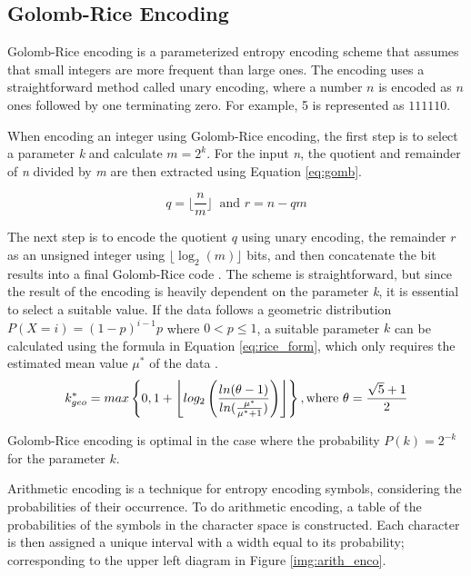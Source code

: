 \subsection{Golomb-Rice Encoding}
Golomb-Rice encoding is a parameterized entropy encoding scheme that assumes that small integers are more frequent than large ones. The encoding uses a straightforward method called unary encoding, where a number \(n\) is encoded as $n$ ones followed by one terminating zero. For example, 5 is represented as \(111110\).

When encoding an integer using Golomb-Rice encoding, the first step is to select a parameter \textit{k} and calculate \(m = 2^k\). For the input \textit{n}, the quotient and remainder of \textit{n} divided by \textit{m} are then extracted using Equation \ref{eq:gomb}.

\begin{equation}
q =\lfloor\frac{n}{m}\rfloor\
   \text{ and }
r = n - qm
\label{eq:gomb}
\end{equation}

The next step is to encode the quotient $q$ using unary encoding, the remainder $r$ as an unsigned integer using $\lfloor \log_2(m) \rfloor$ bits, and then concatenate the bit results into a final Golomb-Rice code \cite{rice2}. The scheme is straightforward, but since the result of the encoding is heavily dependent on the parameter \textit{k}, it is essential to select a suitable value. If the data follows a geometric distribution \(P(X = i) = (1 - p)^{i - 1}p\) where \(0 < p \leq 1\), a suitable parameter $k$  can be calculated using the formula in Equation \ref{eq:rice_form}, which only requires the estimated mean value $\mu^*$ of the data \cite{rice}. 
\begin{equation}\label{eq:rice_form}
k^{*}_{geo} = max \left \{ 0, 1 + \left \lfloor log_2\left ( \frac{ln (\theta  - 1)}{ln(\frac{\mu^* }{\mu^* + 1})} \right ) \right \rfloor \right \},  \textup{where }
 \theta = \frac{\sqrt{5} + 1}{2}
\end{equation}

 Golomb-Rice encoding is optimal in the case where the probability \(P(k) = 2^{-k}\) for the parameter $k$.

Arithmetic encoding is a technique for entropy encoding symbols, considering the probabilities of their occurrence. To do arithmetic encoding, a table of the probabilities of the symbols in the character space is constructed. Each character is then assigned a unique interval with a width equal to its probability; corresponding to the upper left diagram in Figure \ref{img:arith_enco}. 

